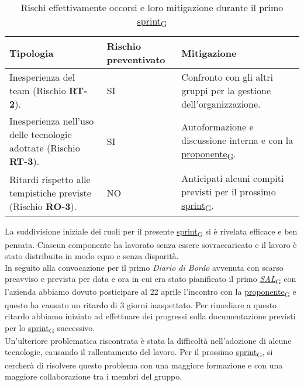 \newpage
{}
\begin{table}[!h]
	\centering
	\begin{tabular}{ | p{6cm} | p{2.5cm} | p{7.5cm} | }
		\hline
		\textbf{Tipologia}                                                       & \textbf{Rischio preventivato} & \textbf{Mitigazione}                                                \\
		\hline
		Inesperienza del team (Rischio \textbf{RT-2}).                           & SI                            & Confronto con gli altri gruppi per la gestione dell'organizzazione. \\
		\hline
		Inesperienza nell'uso delle tecnologie adottate (Rischio \textbf{RT-3}). & SI                            & Autoformazione e discussione interna e con la \href{https://7last.github.io/docs/rtb/documentazione-interna/glossario\#proponente}{proponente\textsubscript{G}}.           \\
		\hline
		Ritardi rispetto alle tempistiche previste (Rischio \textbf{RO-3}).      & NO                            & Anticipati alcuni compiti previsti per il prossimo \href{https://7last.github.io/docs/rtb/documentazione-interna/glossario\#sprint}{sprint\textsubscript{G}}.          \\
		\hline
	\end{tabular}
	\caption{Rischi effettivamente occorsi e loro mitigazione durante il primo \href{https://7last.github.io/docs/rtb/documentazione-interna/glossario\#sprint}{sprint\textsubscript{G}}}
	
\end{table}

La suddivisione iniziale dei ruoli per il presente \href{https://7last.github.io/docs/rtb/documentazione-interna/glossario\#sprint}{sprint\textsubscript{G}} si è rivelata efficace e ben pensata. Ciascun componente ha lavorato senza essere sovraccaricato e il lavoro è stato distribuito in modo equo e senza disparità. \\
In seguito alla convocazione per il primo \textit{Diario di Bordo} avvenuta con scarso preavviso e prevista per data e ora in cui era stato pianificato il primo \href{https://7last.github.io/docs/rtb/documentazione-interna/glossario\#stato-avanzamento-lavori}{\textit{SAL}\textsubscript{G}} con l'azienda abbiamo dovuto posticipare al 22 aprile l'incontro con la \href{https://7last.github.io/docs/rtb/documentazione-interna/glossario\#proponente}{proponente\textsubscript{G}} e questo ha causato un ritardo di 3 giorni inaspettato. Per rimediare a questo ritardo abbiamo iniziato ad effettuare dei progressi sulla documentazione previsti per lo \href{https://7last.github.io/docs/rtb/documentazione-interna/glossario\#sprint}{sprint\textsubscript{G}} successivo. \\
Un'ulteriore problematica riscontrata è stata la difficoltà nell'adozione di alcune tecnologie, causando il rallentamento del lavoro. Per il prossimo \href{https://7last.github.io/docs/rtb/documentazione-interna/glossario\#sprint}{sprint\textsubscript{G}}, si cercherà di risolvere questo problema con una maggiore formazione e con una maggiore collaborazione tra i membri del gruppo.

